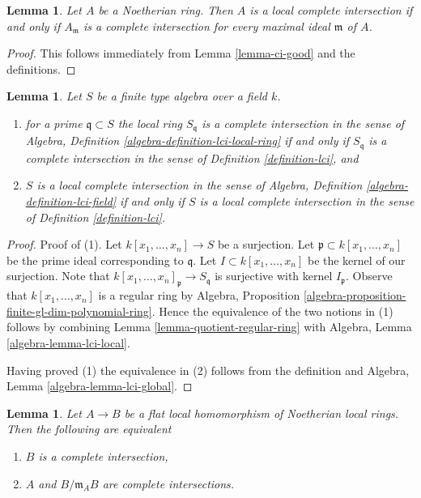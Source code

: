 \documentclass{stacks-project}
\theoremstyle{plain}
\newtheorem{lemma}[subsection]{Lemma}
\theoremstyle{definition}
\theoremstyle{remark}
\numberwithin{equation}{subsection}
\begin{document}
\begin{lemma}
\label{lemma-check-lci-at-maximal-ideals}
Let $A$ be a Noetherian ring. Then $A$ is a local complete intersection
if and only if $A_\mathfrak m$ is a complete intersection for every
maximal ideal $\mathfrak m$ of $A$.
\end{lemma}

\begin{proof}
This follows immediately from Lemma \ref{lemma-ci-good} and the definitions.
\end{proof}

\begin{lemma}
\label{lemma-check-lci-agrees}
Let $S$ be a finite type algebra over a field $k$.
\begin{enumerate}
\item for a prime $\mathfrak q \subset S$ the local ring $S_\mathfrak q$
is a complete intersection in the sense of
Algebra, Definition \ref{algebra-definition-lci-local-ring}
if and only if $S_\mathfrak q$ is a complete
intersection in the sense of Definition \ref{definition-lci}, and
\item $S$ is a local complete intersection in the sense of
Algebra, Definition \ref{algebra-definition-lci-field}
if and only if $S$ is a local complete
intersection in the sense of Definition \ref{definition-lci}.
\end{enumerate}
\end{lemma}

\begin{proof}
Proof of (1). Let $k[x_1, \ldots, x_n] \to S$ be a surjection.
Let $\mathfrak p \subset k[x_1, \ldots, x_n]$ be the prime ideal
corresponding to $\mathfrak q$.
Let $I \subset k[x_1, \ldots, x_n]$ be the kernel of our surjection.
Note that $k[x_1, \ldots, x_n]_\mathfrak p \to S_\mathfrak q$
is surjective with kernel $I_\mathfrak p$. Observe that
$k[x_1, \ldots, x_n]$ is a regular ring by
Algebra, Proposition \ref{algebra-proposition-finite-gl-dim-polynomial-ring}.
Hence the equivalence of the two notions in (1) follows by
combining
Lemma \ref{lemma-quotient-regular-ring}
with Algebra, Lemma \ref{algebra-lemma-lci-local}.

\medskip\noindent
Having proved (1) the equivalence in (2) follows from the
definition and Algebra, Lemma \ref{algebra-lemma-lci-global}.
\end{proof}

\begin{lemma}
\label{lemma-avramov}
Let $A \to B$ be a flat local homomorphism of Noetherian local rings.
Then the following are equivalent
\begin{enumerate}
\item $B$ is a complete intersection,
\item $A$ and $B/\mathfrak m_A B$ are complete intersections.
\end{enumerate}
\end{lemma}
\end{document}
